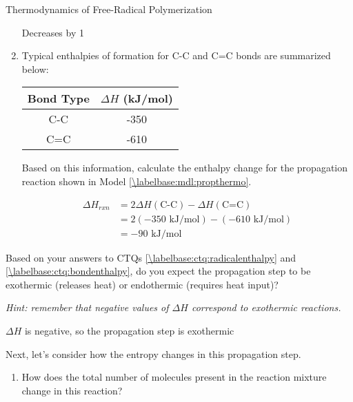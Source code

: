 \begin{activity}{Thermodynamics of Free-Radical Polymerization}
\begin{ctqs}
\begin{enumerate}
				\begin{solution}[0.75in]
					Decreases by 1
				\end{solution}
			
			\item Typical enthalpies of formation for C-C and C=C bonds are summarized below:
				
				\begin{center}
					\renewcommand{\arraystretch}{1.5}
					\begin{tabular}{c c}
						\hline
						Bond Type & $\Delta H$ (kJ/mol) \\\hline
						C-C	&	-350 \\
						C=C &	-610 \\\hline
					\end{tabular}
				\end{center}
				
				Based on this information, calculate the enthalpy change for the propagation reaction shown in Model \ref{\labelbase:mdl:propthermo}.
				
				\begin{solution}[1.25in]
					\begin{align*}
						\Delta H_{rxn} &= 2\Delta H(\text{C-C}) - \Delta H (\text{C=C})\\
							&= 2(-350\text{ kJ/mol}) - (-610\text{ kJ/mol})\\
							&= -90\text{ kJ/mol}
					\end{align*}
				\end{solution}
		\end{enumerate}
		
	\question Based on your answers to CTQs \ref{\labelbase:ctq:radicalenthalpy} and \ref{\labelbase:ctq:bondenthalpy}, do you expect the propagation step to be exothermic (releases heat) or endothermic (requires heat input)?
	
		\emph{Hint: remember that negative values of $\Delta H$ correspond to exothermic reactions.}
				
				\begin{solution}[0.75in]
					$\Delta H$ is negative, so the propagation step is exothermic
				\end{solution}
		
	\question Next, let's consider how the entropy changes in this propagation step.
	
		\begin{enumerate}
			
			\item How does the total number of molecules present in the reaction mixture change in this reaction?
				

\end{enumerate}
\end{ctqs}
\end{activity}

